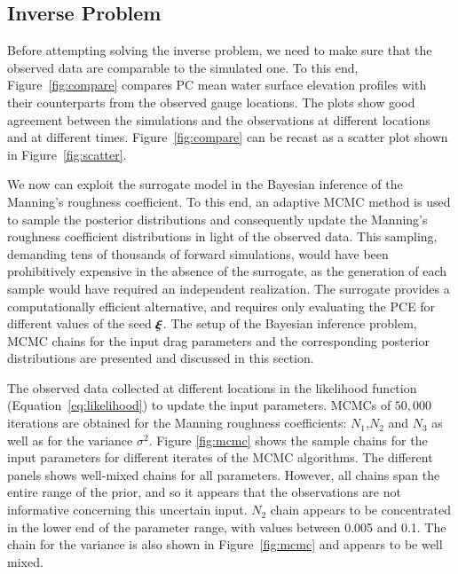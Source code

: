 \subsection{Inverse Problem} 
\label{sec:inverse}

Before attempting solving the inverse problem,
we need to make sure that the observed data are
comparable to the simulated one.
To this end, Figure~\ref{fig:compare}
compares PC mean water surface elevation profiles
with their counterparts from the observed gauge locations.
The plots show good agreement between the simulations and the observations at different
locations and at different times. Figure~\ref{fig:compare} can be recast as a scatter plot shown in 
Figure~\ref{fig:scatter}.

We now can exploit the surrogate model in the Bayesian inference of the Manning's 
roughness coefficient.  To this end, an adaptive MCMC method is used to sample 
the posterior distributions \citep{Gareth2009,Haario2001} and consequently 
update the Manning's roughness coefficient distributions in light of the 
observed data. This sampling, demanding tens of thousands of forward simulations, 
would have been prohibitively expensive in the
absence of the surrogate, as the generation of each sample would have required an
independent \geoclaw realization. The surrogate provides a computationally
efficient alternative, and requires only evaluating the PCE for different values 
of the seed $\xxi$. The setup of the Bayesian inference problem,
MCMC chains for the input drag parameters and the corresponding posterior distributions are 
presented and discussed in this section. 




The observed data collected at different locations 
in the likelihood function (Equation~\eqref{eq:likelihood}) to update the input parameters.
MCMCs of $50,000$ iterations are obtained for the Manning roughness coefficients: 
$N_1$,$N_2$ and $N_3$ as well as for the variance $\sigma^2$. Figure \ref{fig:mcmc} 
shows the sample chains for
the input parameters for different iterates of the MCMC algorithms. 
The different panels
shows well-mixed chains for all parameters.
However, all chains span the entire range
of the prior, and so it appears that the observations are not informative 
concerning this uncertain input.  $N_{2}$ chain appears to be concentrated in the lower end of the
parameter range, with values between 0.005 and 0.1.
The chain for the variance is also shown in 
Figure~\ref{fig:mcmc} and appears to be well mixed.





